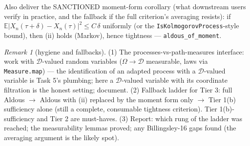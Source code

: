 \documentclass[11pt]{article}
\theoremstyle{plain}
\theoremstyle{remark}
\newtheorem{remark}{Remark}
\newcommand{\E}{\mathbb{E}}\newcommand{\PP}{\mathbb{P}}\newcommand{\R}{\mathbb{R}}
\newcommand{\D}{\mathcal D}
\begin{document}
Also deliver the SANCTIONED moment-form corollary (what downstream users
verify in practice, and the fallback if the full criterion's averaging
resists): if $\E|X_n(\tau+\delta)-X_n(\tau)|^2\le C\,\delta$ uniformly (or the
\texttt{IsKolmogorovProcess}-style bound), then (ii) holds (Markov), hence
tightness --- \texttt{aldous\_of\_moment}.

\begin{remark}[hygiene and fallbacks]
(1) The processes-vs-path-measures interface: work with $\D$-valued random
variables ($\Omega\to\D$ measurable, laws via \texttt{Measure.map}) --- the
identification of an adapted process with a $\D$-valued variable is Task 5's
plumbing; here a $\D$-valued variable with its coordinate filtration is the
honest setting; document.
(2) Fallback ladder for Tier 3: full Aldous $\to$ Aldous with (ii) replaced by
the moment form only $\to$ Tier 1(b) sufficiency alone (still a complete,
consumable tightness criterion). Tier 1(b)-sufficiency and Tier 2 are
must-haves.
(3) Report: which rung of the ladder was reached; the measurability lemmas
proved; any Billingsley-16 gaps found (the averaging argument is the likely
spot).
\end{remark}
\end{document}
